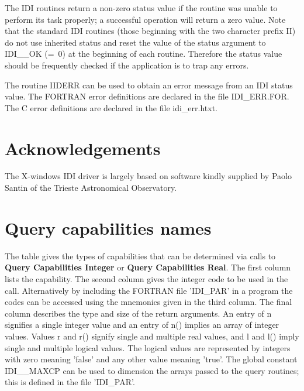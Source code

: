 The IDI routines return a non-zero status value if the routine was
unable to perform its task properly; a successful operation will return
a zero value. Note that the standard IDI routines (those beginning with
the two character prefix II) do not use inherited status and reset the
value of the status argument to IDI\_\_OK (=~0) at the beginning of each
routine. Therefore the status value should be frequently checked if the
application is to trap any errors.

The routine IIDERR can be used to obtain an error message from an
IDI status value. The FORTRAN error definitions are declared in the
file IDI\_ERR.FOR. The C error definitions are declared in
the file idi\_err.htxt.

\section{Acknowledgements}

The X-windows IDI driver is largely based on software kindly supplied
by Paolo Santin of the Trieste Astronomical Observatory.

\newpage
\appendix
\section{Query capabilities names}
\label{se:qcn}

The table gives the types of capabilities that can be determined via calls
to {\bf Query Capabilities Integer} or {\bf Query Capabilities Real}.
The first column lists the capability. The second column gives the
integer code to be used in the call. Alternatively by including the
FORTRAN file 'IDI\_PAR' in a program the codes can be accessed using
the mnemonics given in the third column. The final column describes
the type and size of the return arguments. An entry of n
signifies a single integer value and an entry of n() implies an
array of integer values. Values r and r() signify single and multiple
real values, and l and l() imply single and multiple logical values.
The logical values are represented by integers with zero meaning 'false'
and any other value meaning 'true'.
The global constant IDI\_\_MAXCP can be used to dimension the arrays passed
to the query routines; this is defined in the file 'IDI\_PAR'.

